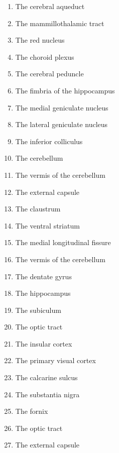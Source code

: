 \documentclass[]{book}
\providecommand{\tightlist}{%
  \setlength{\itemsep}{0pt}\setlength{\parskip}{0pt}}
\begin{document}
\begin{enumerate}
\def\labelenumi{\arabic{enumi}.}
\tightlist
\item
  The cerebral aqueduct
\item
  The mammillothalamic tract
\item
  The red nucleus
\item
  The choroid plexus
\item
  The cerebral peduncle
\item
  The fimbria of the hippocampus
\item
  The medial geniculate nucleus
\item
  The lateral geniculate nucleus
\item
  The inferior colliculus
\item
  The cerebellum
\item
  The vermis of the cerebellum
\item
  The external capsule
\item
  The claustrum
\item
  The ventral striatum
\item
  The medial longitudinal fissure
\item
  The vermis of the cerebellum
\item
  The dentate gyrus
\item
  The hippocampus
\item
  The subiculum
\item
  The optic tract
\item
  The insular cortex
\item
  The primary visual cortex
\item
  The calcarine sulcus
\item
  The substantia nigra
\item
  The fornix
\item
  The optic tract
\item
  The external capsule
\end{enumerate}
\end{document}
